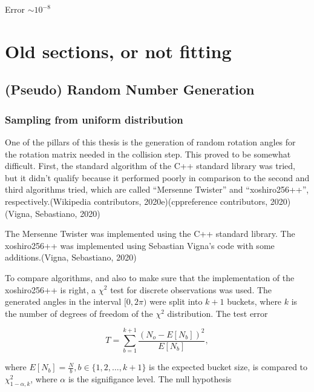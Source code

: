 \documentclass[
]{article}
\begin{document}
Error \(\sim 10^{-8}\)

\hypertarget{old-sections-or-not-fitting}{%
\section{Old sections, or not
fitting}\label{old-sections-or-not-fitting}}

\hypertarget{pseudo-random-number-generation}{%
\subsection{(Pseudo) Random Number
Generation}\label{pseudo-random-number-generation}}

\hypertarget{sampling-from-uniform-distribution}{%
\subsubsection{Sampling from uniform
distribution}\label{sampling-from-uniform-distribution}}

One of the pillars of this thesis is the generation of random rotation
angles for the rotation matrix needed in the collision step. This proved
to be somewhat difficult. First, the standard algorithm of the C++
standard library was tried, but it didn't qualify because it performed
poorly in comparison to the second and third algorithms tried, which are
called ``Mersenne Twister'' and ``xoshiro256++'',
respectively.(Wikipedia contributors, 2020e)(cppreference contributors,
2020)(Vigna, Sebastiano, 2020)

The Mersenne Twister was implemented using the C++ standard library. The
xoshiro256++ was implemented using Sebastian Vigna's code with some
additions.(Vigna, Sebastiano, 2020)

To compare algorithms, and also to make sure that the implementation of
the xoshiro256++ is right, a \(\chi^2\) test for discrete observations
was used. The generated angles in the interval \([0, 2\pi)\) were split
into \(k+1\) buckets, where \(k\) is the number of degrees of freedom of
the \(\chi^2\) distribution. The test error

\begin{equation}
T = \sum_{b=1}^{k+1}{\frac{(N_o - E[N_b])^2}{E[N_b]}},
\end{equation}

where \(E[N_b] = \frac{N}{b}, b \in \{1, 2, \dots , k+1\}\) is the
expected bucket size, is compared to \(\chi^2_{1-\alpha, k}\), where
\(\alpha\) is the signifigance level. The null hypothesis
\end{document}

